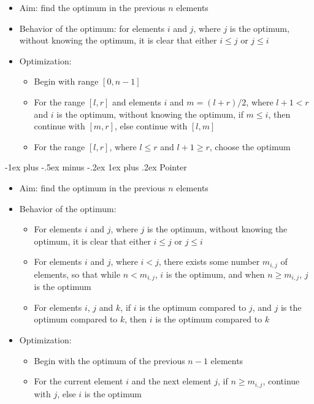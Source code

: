 \documentclass{article}
\makeatletter
\renewcommand{\subsubsection}{\@startsection{subsubsection}{3}{0mm}%
	{-1ex plus -.5ex minus -.2ex}%
	{1ex plus .2ex}%
	{\normalfont\small\bfseries}}
\makeatother
\begin{document}
\begin{landscape}
\begin{multicols}{2}
			\begin{itemize}
				\item Aim: find the optimum in the previous $n$ elements
				\item Behavior of the optimum: for elements $i$ and $j$, where $j$ is the optimum, without knowing the optimum, it is clear that either $i\le j$ or $j\le i$
				\item Optimization:
				\begin{itemize}
					\item Begin with range $[0,n-1]$
					\item For the range $[l,r]$ and elements $i$ and $m=(l+r)/2$, where $l+1<r$ and $i$ is the optimum, without knowing the optimum, if $m\le i$, then continue with $[m,r]$, else continue with $[l,m]$
					\item For the range $[l,r]$, where $l\le r$ and $l+1\ge r$, choose the optimum
				\end{itemize}
			\end{itemize}
			
			\subsubsection{Pointer}
			
			\begin{itemize}
				\item Aim: find the optimum in the previous $n$ elements
				\item Behavior of the optimum:
				\begin{itemize}
					\item For elements $i$ and $j$, where $j$ is the optimum, without knowing the optimum, it is clear that either $i\le j$ or $j\le i$
					\item For elements $i$ and $j$, where $i<j$, there exists some number $m_{i,j}$ of elements, so that while $n<m_{i,j}$, $i$ is the optimum, and when $n\ge m_{i,j}$, $j$ is the optimum
					\item For elements $i$, $j$ and $k$, if $i$ is the optimum compared to $j$, and $j$ is the optimum compared to $k$, then $i$ is the optimum compared to $k$
				\end{itemize}
				\item Optimization:
				\begin{itemize}
					\item Begin with the optimum of the previous $n-1$ elements
					\item For the current element $i$ and the next element $j$, if $n\ge m_{i,j}$, continue with $j$, else $i$ is the optimum
				\end{itemize}
			\end{itemize}
			

\end{multicols}
\end{landscape}
\end{document}
